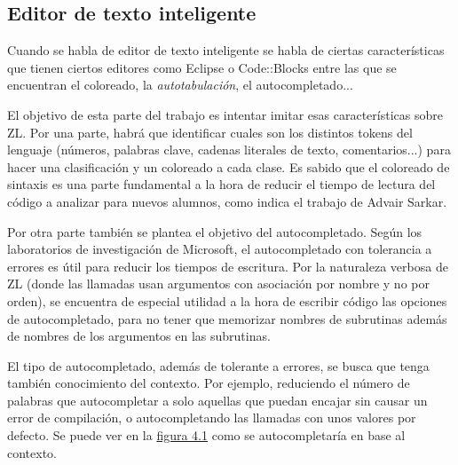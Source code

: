 \documentclass{report}
\begin{document}
	\subsection{Editor de texto inteligente}
	
	Cuando se habla de editor de texto inteligente se habla de ciertas características que tienen ciertos editores como Eclipse o Code::Blocks entre las que se encuentran el coloreado, la \textit{autotabulación}, el autocompletado... 
	
	\vspace{10px}
	
	El objetivo de esta parte del trabajo es intentar imitar esas características sobre ZL. Por una parte, habrá que identificar cuales son los distintos tokens del lenguaje (números, palabras clave, cadenas literales de texto, comentarios...) para hacer una clasificación y un coloreado a cada clase. Es sabido que el coloreado de sintaxis es una parte fundamental a la hora de reducir el tiempo de lectura del código a analizar para nuevos alumnos, como indica el trabajo de Advair Sarkar\cite{syntaxhighlight}.
	
	\vspace{10px}
	
	Por otra parte también se plantea el objetivo del autocompletado. Según los laboratorios de investigación de Microsoft, el autocompletado con tolerancia a errores es útil para reducir los tiempos de escritura\cite{microsoftresearchautocomplete}. Por la naturaleza verbosa de ZL (donde las llamadas usan argumentos con asociación por nombre y no por orden), se encuentra de especial utilidad a la hora de escribir código las opciones de autocompletado, para no tener que memorizar nombres de subrutinas además de nombres de los argumentos en las subrutinas. 

	\vspace{10px}

	El tipo de autocompletado, además de tolerante a errores, se busca que tenga también conocimiento del contexto. Por ejemplo, reduciendo el número de palabras que autocompletar a solo aquellas que puedan encajar sin causar un error de compilación, o autocompletando las llamadas con unos valores por defecto. Se puede ver en la \hyperref[fig:completion]{figura 4.1} como se autocompletaría en base al contexto.
	
\end{document}
